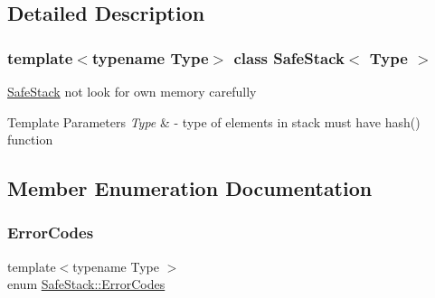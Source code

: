 \subsection{Detailed Description}
\subsubsection*{template$<$typename Type$>$\newline
class Safe\+Stack$<$ Type $>$}

\hyperlink{classSafeStack}{Safe\+Stack} not look for own memory carefully 
\begin{DoxyTemplParams}{Template Parameters}
{\em Type} & -\/ type of elements in stack must have hash() function \\
\hline
\end{DoxyTemplParams}


\subsection{Member Enumeration Documentation}
\mbox{\label{classSafeStack_a3a6ee072918bd0a2c09fa0ea12c1ab64}} 
\subsubsection{\texorpdfstring{Error\+Codes}{ErrorCodes}}
{\footnotesize\ttfamily template$<$typename Type $>$ \\
enum \hyperlink{classSafeStack_a3a6ee072918bd0a2c09fa0ea12c1ab64}{Safe\+Stack\+::\+Error\+Codes}}

